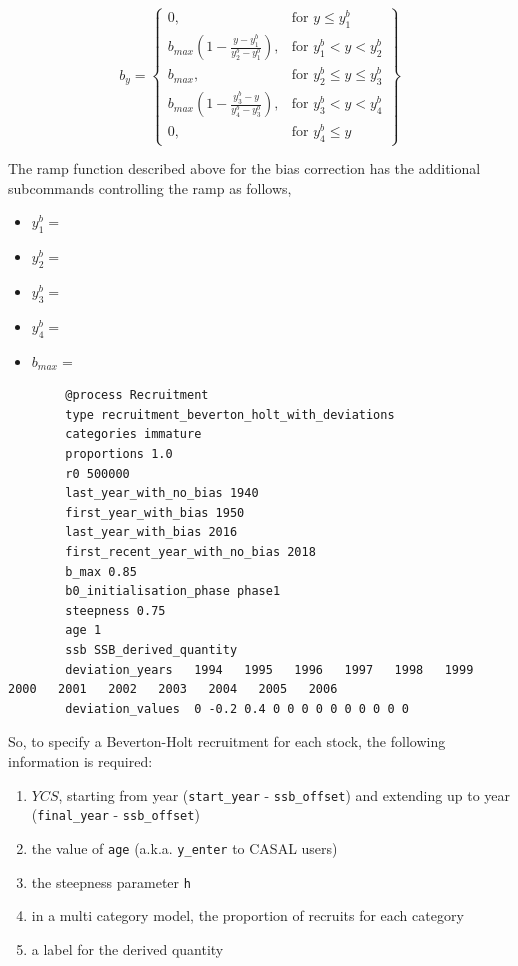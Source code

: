 \begin{equation}\label{eq::bias}
	    b_y = \left\{\begin{array}{lr}
	0, & \text{for }y\leq y_1^b\\
	b_{max}(1 - \frac{y - y_1^b}{y_2^b - y_1^b}), & \text{for } y_1^b < y < y_2^b\\
	b_{max}, & \text{for } y_2^b\leq y \leq y_3^b\\
	b_{max}(1 - \frac{y_3^b - y}{y_4^b - y_3^b}), & \text{for }  y_3^b< y < y_4^b\\
	0, & \text{for } y_4^b\leq y
	\end{array}\right\}
\end{equation}

The ramp function described above for the bias correction has the additional subcommands controlling the ramp as follows,
\begin{itemize}
	\item $y_1^b = $ 
	\item $y_2^b = $ 
	\item $y_3^b = $ 
	\item $y_4^b = $ 
	\item $b_{max} = $ 
\end{itemize}

{\small{\begin{verbatim}
		@process Recruitment
		type recruitment_beverton_holt_with_deviations
		categories immature
		proportions 1.0
		r0 500000
		last_year_with_no_bias 1940
		first_year_with_bias 1950
		last_year_with_bias 2016
		first_recent_year_with_no_bias 2018
		b_max 0.85
		b0_initialisation_phase phase1
		steepness 0.75
		age 1
		ssb SSB_derived_quantity
		deviation_years   1994   1995   1996   1997   1998   1999   2000   2001   2002   2003   2004   2005   2006
		deviation_values  0 -0.2 0.4 0 0 0 0 0 0 0 0 0 0
\end{verbatim}}}


So, to specify a Beverton-Holt recruitment for each stock, the following information is required:
\begin{enumerate}
	\item $YCS$, starting from year (\texttt{start\_year} - \texttt{ssb\_offset}) and extending up to year (\texttt{final\_year} - \texttt{ssb\_offset})
	\item the value of \texttt{age} (a.k.a. \texttt{y\_enter} to CASAL users)
	\item the steepness parameter \texttt{h}
	\item in a multi category model, the proportion of recruits for each category
	\item a label for the derived quantity
\end{enumerate}

